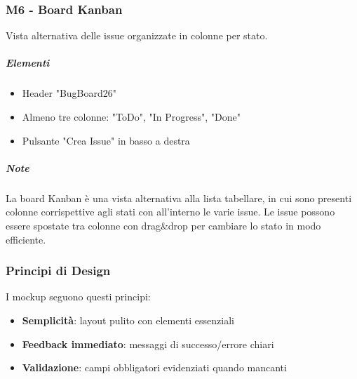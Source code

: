 \subsubsection{M6 - Board Kanban}

Vista alternativa delle issue organizzate in colonne per stato.

\subparagraph{Elementi}
\begin{itemize}[leftmargin=1.1em]
\item Header "BugBoard26"
\item Almeno tre colonne: "ToDo", "In Progress", "Done"
\item Pulsante "Crea Issue" in basso a destra
\end{itemize}

\subparagraph{Note}
La board Kanban è una vista alternativa alla lista tabellare, in cui sono presenti colonne corrispettive agli stati con all'interno le varie issue. Le issue possono essere spostate tra colonne con drag\&drop per cambiare lo stato in modo efficiente.

\subsubsection{Principi di Design}
\label{subsec:principi-design}

I mockup seguono questi principi:

\begin{itemize}[leftmargin=1.1em]
\item \textbf{Semplicità}: layout pulito con elementi essenziali
\item \textbf{Feedback immediato}: messaggi di successo/errore chiari
\item \textbf{Validazione}: campi obbligatori evidenziati quando mancanti
\end{itemize}
